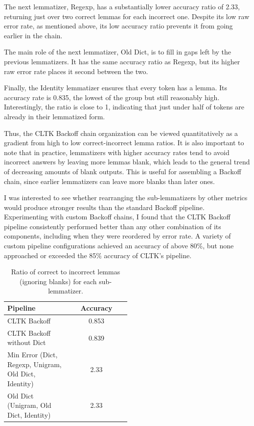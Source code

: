 \documentclass[11pt]{article}
\begin{document}
The next lemmatizer, Regexp, has a substantially lower accuracy ratio of 2.33, returning just over two correct lemmas for each incorrect one. Despite its low raw error rate, as mentioned above, its low accuracy ratio prevents it from going earlier in the chain.

The main role of the next lemmatizer, Old Dict, is to fill in gaps left by the previous lemmatizers. It has the same accuracy ratio as Regexp, but its higher raw error rate places it second between the two.

Finally, the Identity lemmatizer ensures that every token has a lemma. Its accuracy rate is 0.835, the lowest of the group but still reasonably high. Interestingly, the ratio is close to 1, indicating that just under half of tokens are already in their lemmatized form.

Thus, the CLTK Backoff chain organization can be viewed quantitatively as a gradient from high to low correct-incorrect lemma ratios. It is also important to note that in practice, lemmatizers with higher accuracy rates tend to avoid incorrect answers by leaving more lemmas blank, which leads to the general trend of decreasing amounts of blank outputs. This is useful for assembling a Backoff chain, since earlier lemmatizers can leave more blanks than later ones.

I was interested to see whether rearranging the sub-lemmatizers by other metrics would produce stronger results than the standard Backoff pipeline. Experimenting with custom Backoff chains, I found that the CLTK Backoff pipeline consistently performed better than any other combination of its components, including when they were reordered by error rate. A variety of custom pipeline configurations achieved an accuracy of above 80\%, but none approached or exceeded the 85\% accuracy of CLTK’s pipeline.

    \begin{table}[]
        \centering
        \begin{tabular}{| p{0.5\linewidth} | c |}
             \hline
             Pipeline & Accuracy \\
             \hline
             CLTK Backoff & 0.853 \\
             CLTK Backoff without Dict & 0.839 \\
             Min Error \newline (Dict, Regexp, Unigram, Old Dict, Identity) & 2.33 \\
             Old Dict \newline (Unigram, Old Dict, Identity) & 2.33 \\
             \hline
        \end{tabular}
        \caption{Ratio of correct to incorrect lemmas (ignoring blanks) for each sub-lemmatizer.}
        \label{tab:my_label}
    \end{table}
\end{document}
